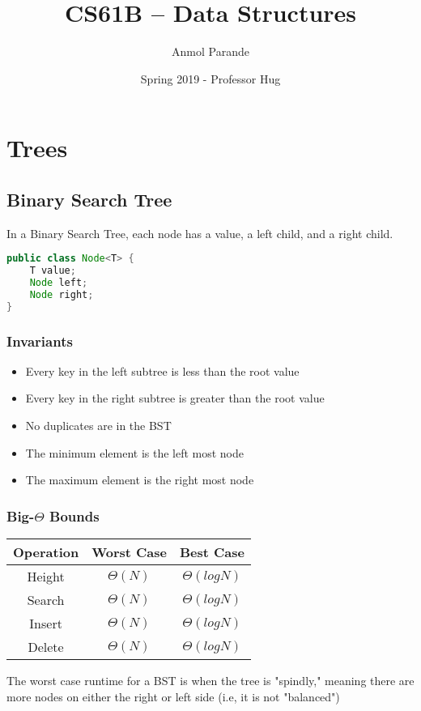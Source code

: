 \documentclass{article}
\begin{document}
    \title{CS61B -- Data Structures}
    \author{Anmol Parande}
    \date{Spring 2019 - Professor Hug}
    \maketitle

\section{Trees}
\subsection{Binary Search Tree}
In a Binary Search Tree, each node has a value, a left child, and a right child.
\begin{lstlisting}[language=Java]
public class Node<T> {
    T value;
    Node left;
    Node right;
}
\end{lstlisting}
\subsubsection{Invariants}
\begin{itemize}
    \item Every key in the left subtree is less than the root value
    \item Every key in the right subtree is greater than the root value
    \item No duplicates are in the BST
    \item The minimum element is the left most node
    \item The maximum element is the right most node
\end{itemize}
\subsubsection{Big-$\Theta$ Bounds}
\begin{center}
    \begin{tabular}{ c | c | c }
     Operation & Worst Case & Best Case\\
     \hline
     Height & $\Theta(N)$ & $\Theta(log N)$ \\ 
     Search & $\Theta(N)$ & $\Theta(log N)$ \\  
     Insert & $\Theta(N)$ & $\Theta(log N)$ \\
     Delete & $\Theta(N)$ & $\Theta(log N)$    
    \end{tabular}
\end{center}
The worst case runtime for a BST is when the tree is "spindly," meaning there are more nodes on either the right or left side (i.e, it is not "balanced")
\end{document}
